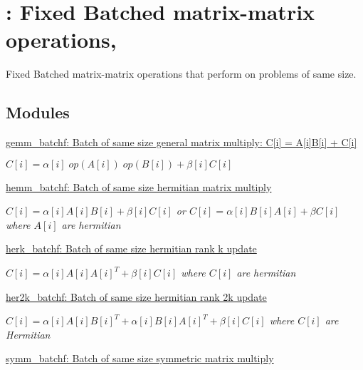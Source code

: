 \hypertarget{group__core__batched__blas}{}\section{\+: Fixed Batched matrix-\/matrix operations,}
\label{group__core__batched__blas}


Fixed Batched matrix-\/matrix operations that perform on problems of same size.  


\subsection*{Modules}
\begin{DoxyCompactItemize}
\item 
\hyperlink{group__gemm__batchf}{gemm\+\_\+batchf\+:  Batch of same size general  matrix multiply\+: C\mbox{[}i\mbox{]} = A\mbox{[}i\mbox{]}\+B\mbox{[}i\mbox{]} + C\mbox{[}i\mbox{]}}
\begin{DoxyCompactList}\small\item\em $ C[i] = \alpha[i] \;op(A[i]) \;op(B[i]) + \beta[i] C[i] $ \end{DoxyCompactList}\item 
\hyperlink{group__hemm__batchf}{hemm\+\_\+batchf\+: Batch of same size hermitian matrix multiply}
\begin{DoxyCompactList}\small\item\em $ C[i] = \alpha[i] A[i] B[i] + \beta[i] C[i] $ or $ C[i] = \alpha[i] B[i] A[i] + \beta C[i] $ where $ A[i] $ are hermitian \end{DoxyCompactList}\item 
\hyperlink{group__herk__batchf}{herk\+\_\+batchf\+:  Batch of same size hermitian rank k update}
\begin{DoxyCompactList}\small\item\em $ C[i] = \alpha[i] A[i] A[i]^T + \beta[i] C[i] $ where $ C[i] $ are hermitian \end{DoxyCompactList}\item 
\hyperlink{group__her2k__batchf}{her2k\+\_\+batchf\+: Batch of same size hermitian rank 2k update}
\begin{DoxyCompactList}\small\item\em $ C[i] = \alpha[i] A[i] B[i]^T + \alpha[i] B[i] A[i]^T + \beta[i] C[i] $ where $ C[i] $ are Hermitian \end{DoxyCompactList}\item 
\hyperlink{group__symm__batchf}{symm\+\_\+batchf\+:  Batch of same size symmetric matrix multiply}

\end{DoxyCompactItemize}
